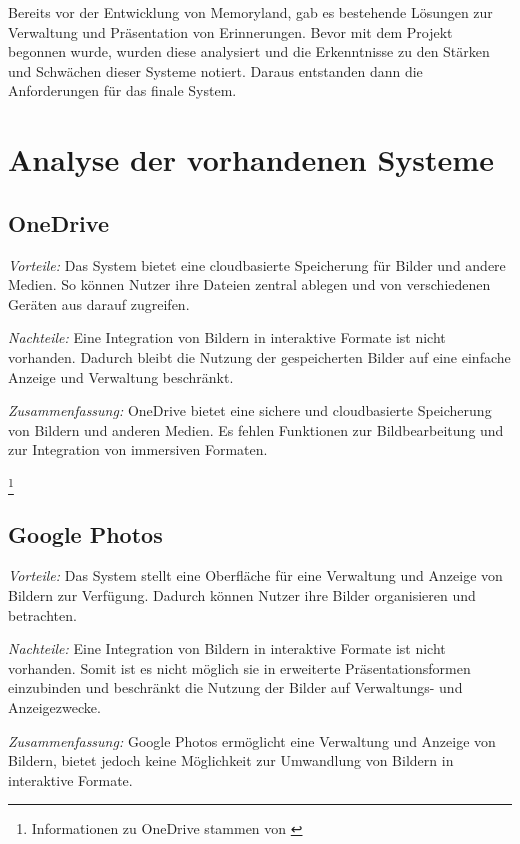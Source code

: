 Bereits vor der Entwicklung von Memoryland, gab es bestehende Lösungen zur Verwaltung
und Präsentation von Erinnerungen. Bevor mit dem Projekt begonnen wurde, wurden
diese analysiert und die Erkenntnisse zu den Stärken und Schwächen dieser Systeme
notiert. Daraus entstanden dann die Anforderungen für das finale System.

\section{Analyse der vorhandenen Systeme}

\subsection{OneDrive}

\emph{Vorteile:}
Das System bietet eine cloudbasierte Speicherung für Bilder und andere Medien. 
So können Nutzer ihre Dateien zentral ablegen und von verschiedenen Geräten aus darauf 
zugreifen.

\emph{Nachteile:}
Eine Integration von Bildern in interaktive Formate ist nicht vorhanden. 
Dadurch bleibt die Nutzung der gespeicherten Bilder auf eine einfache 
Anzeige und Verwaltung beschränkt.

\emph{Zusammenfassung:}
OneDrive bietet eine sichere und cloudbasierte Speicherung von Bildern und anderen 
Medien. Es fehlen Funktionen zur Bildbearbeitung und zur Integration von 
immersiven Formaten.

\footnote{Informationen zu OneDrive stammen von \cite{MicrosoftCorporation}}

\subsection{Google Photos}

\emph{Vorteile:}
Das System stellt eine Oberfläche für eine Verwaltung und Anzeige von Bildern 
zur Verfügung. Dadurch können Nutzer ihre Bilder organisieren und betrachten.

\emph{Nachteile:}
Eine Integration von Bildern in interaktive Formate ist nicht vorhanden. 
Somit ist es nicht möglich sie in erweiterte Präsentationsformen einzubinden 
und beschränkt die Nutzung der Bilder auf Verwaltungs- und Anzeigezwecke.

\emph{Zusammenfassung:}
Google Photos ermöglicht eine Verwaltung und Anzeige von Bildern, bietet jedoch 
keine Möglichkeit zur Umwandlung von Bildern in interaktive Formate.

